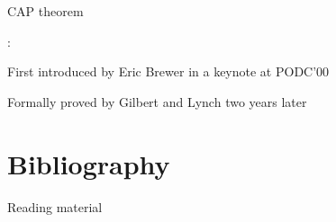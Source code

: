 \begin{frame}{CAP theorem}

:

\BIL
\item First introduced by Eric Brewer in a keynote at PODC'00
\BI
\item {\footnotesize {}}
\EI
\item Formally proved by Gilbert and Lynch two years later
\BI
\item {\footnotesize {}}
\EI
\EIL
\end{frame}


\section{Bibliography}

\begin{frame}{Reading material}

{\footnotesize
\BIL
\item {}
\item {}
\EIL
}


\end{frame}

